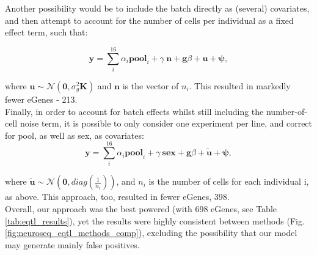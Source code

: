 Another possibility would be to include the batch directly as (several) covariates, and then attempt to account for the number of cells per individual as a fixed effect term, such that:

\begin{equation}\label{eq:neuroseq_batch_kinship}
    \mathbf{y} = \sum_i^{16}\alpha_i \mathbf{pool}_i + \gamma \ \mathbf{n} + \mathbf{g}\beta + \mathbf{u} + \boldsymbol{\psi}, 
\end{equation}

where $ \mathbf{u} \sim \mathcal{N}(\mathbf{0},\sigma_g^2\mathbf{K})$ and $\mathbf{n}$ is the vector of $n_i$. 
This resulted in markedly fewer eGenes - 213.\\

Finally, in order to account for batch effects whilst still including the number-of-cell noise term, it is possible to only consider one experiment per line, and correct for pool, as well as sex, as covariates:
\begin{equation}\label{eq:neuroseq_batch_ncell}
    \mathbf{y} = \sum_i^{16}\alpha_i \mathbf{pool}_i + \gamma \ \mathbf{sex} + \mathbf{g}\beta + \tilde{\mathbf{u}} + \boldsymbol{\psi}, 
\end{equation}

where $\tilde{\mathbf{u}} \sim \mathcal{N}(\mathbf{0}, diag(\frac{1}{n_i}))$, and $n_i$ is the number of cells for each individual i, as above.
This approach, too, resulted in fewer eGenes, 398.\\

Overall, our approach was the best powered (with 698 eGenes, see Table \ref{tab:eqtl_results}), yet the results were highly consistent between methods (Fig. \ref{fig:neuroseq_eqtl_methods_comp}), excluding the possibility that our model may generate mainly false positives.

